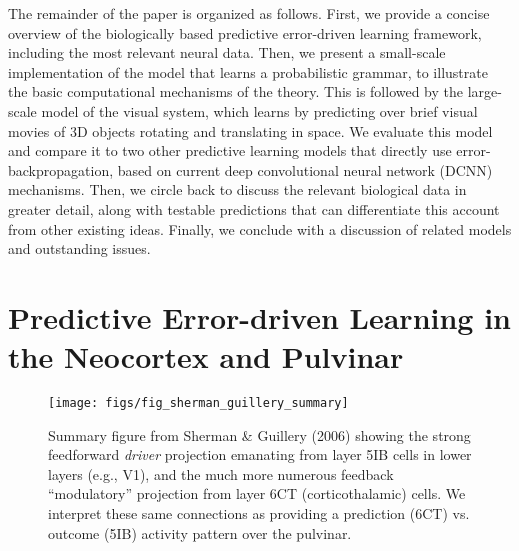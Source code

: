 \documentclass[11pt,twoside]{article}
\newif\myifpdf
\begin{document}
The remainder of the paper is organized as follows.  First, we provide a concise overview of the biologically based predictive error-driven learning framework, including the most relevant neural data.  Then, we present a small-scale implementation of the model that learns a probabilistic grammar, to illustrate the basic computational mechanisms of the theory.  This is followed by the large-scale model of the visual system, which learns by predicting over brief visual movies of 3D objects rotating and translating in space.  We evaluate this model and compare it to two other predictive learning models that directly use error-backpropagation, based on current deep convolutional neural network (DCNN) mechanisms.  Then, we circle back to discuss the relevant biological data in greater detail, along with testable predictions that can differentiate this account from other existing ideas.  Finally, we conclude with a discussion of related models and outstanding issues.

\section{Predictive Error-driven Learning in the Neocortex and Pulvinar}

\begin{figure}
  \centering\texttt{[image: figs/fig\_sherman\_guillery\_summary]}
  \caption{\footnotesize Summary figure from Sherman \& Guillery (2006) showing the strong feedforward \emph{driver} projection emanating from layer 5IB cells in lower layers (e.g., V1), and the much more numerous feedback ``modulatory'' projection from layer 6CT (corticothalamic) cells.  We interpret these same connections as providing a prediction (6CT) vs. outcome (5IB) activity pattern over the pulvinar.}
  \label{fig.sg06}
\end{figure}
\end{document}

